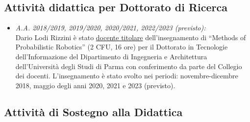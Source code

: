 \documentclass[11pt]{article}
\newcommand{\ITEMDATE}[1]{\item \textit{#1:}\\}
\begin{document}
\subsection*{Attivit\`a didattica per Dottorato di Ricerca}

\begin{itemize}

\ITEMDATE{A.A. 2018/2019, 2019/2020, 2020/2021, 2022/2023 (previsto)}
Dario Lodi Rizzini \`e stato \underline{docente titolare} dell'insegnamento di ``Methods of Probabilistic Robotics'' (2 CFU, 16 ore)
per il Dottorato in Tecnologie dell'Informazione del Dipartimento di Ingegneria e Architettura 
dell'Universit\`a degli Studi di Parma con conferimento da parte del Collegio dei docenti. 
L'insegnamento \`e stato svolto nei periodi: novembre-dicembre 2018, maggio degli anni 2020, 2021 e 2023 (previsto). 

\end{itemize}

\subsection*{Attivit\`a di Sostegno alla Didattica}
\end{document}
